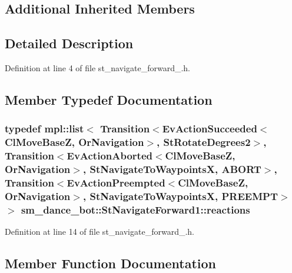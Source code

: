 \subsection*{Additional Inherited Members}


\subsection{Detailed Description}


Definition at line 4 of file st\+\_\+navigate\+\_\+forward\+\_.\+h.



\subsection{Member Typedef Documentation}
\subsubsection[{\texorpdfstring{reactions}{reactions}}]{\setlength{\rightskip}{0pt plus 5cm}typedef mpl\+::list$<$ Transition$<$Ev\+Action\+Succeeded$<${\bf Cl\+Move\+BaseZ}, {\bf Or\+Navigation}$>$, {\bf St\+Rotate\+Degrees2}$>$, Transition$<$Ev\+Action\+Aborted$<${\bf Cl\+Move\+BaseZ}, {\bf Or\+Navigation}$>$, {\bf St\+Navigate\+To\+WaypointsX}, {\bf A\+B\+O\+RT}$>$, Transition$<$Ev\+Action\+Preempted$<${\bf Cl\+Move\+BaseZ}, {\bf Or\+Navigation}$>$, {\bf St\+Navigate\+To\+WaypointsX}, {\bf P\+R\+E\+E\+M\+PT}$>$ $>$ {\bf sm\+\_\+dance\+\_\+bot\+::\+St\+Navigate\+Forward1\+::reactions}}\hypertarget{structsm__dance__bot_1_1StNavigateForward1_a4a49d0c774d44f96b17ceac4c6628104}{}\label{structsm__dance__bot_1_1StNavigateForward1_a4a49d0c774d44f96b17ceac4c6628104}


Definition at line 14 of file st\+\_\+navigate\+\_\+forward\+\_.\+h.



\subsection{Member Function Documentation}
